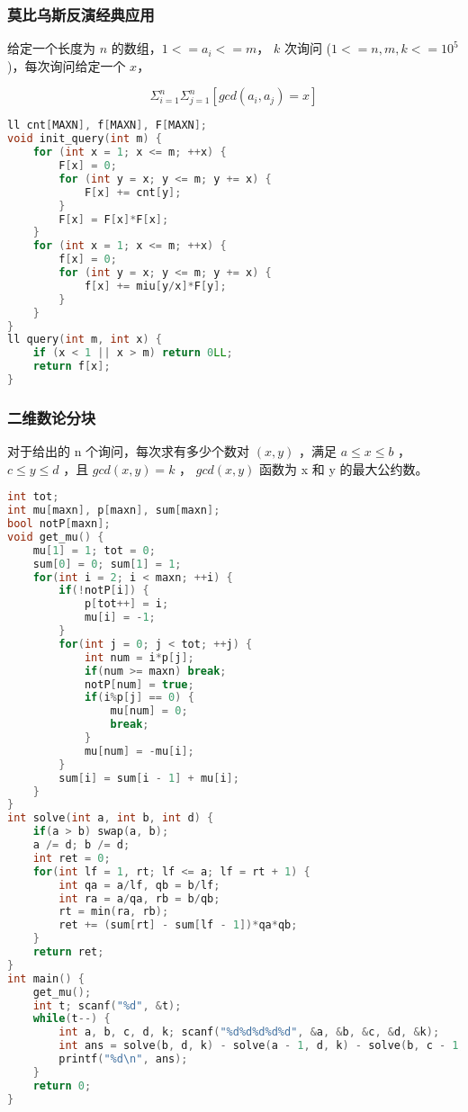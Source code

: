 \subsubsection{莫比乌斯反演经典应用}

给定一个长度为 $n$ 的数组，$1 <= a _ i <= m$， $k$ 次询问 ($ 1 <= n, m, k <= 10^5$)，每次询问给定一个 $x$， 

$$\Sigma _ {i = 1} ^ {n} \Sigma _ {j = 1} ^ {n} [gcd(a_i, a_j) = x]$$

\begin{lstlisting}[language=C++]
ll cnt[MAXN], f[MAXN], F[MAXN];
void init_query(int m) {
    for (int x = 1; x <= m; ++x) {
        F[x] = 0;
        for (int y = x; y <= m; y += x) {
            F[x] += cnt[y];
        }
        F[x] = F[x]*F[x];
    }
    for (int x = 1; x <= m; ++x) {
        f[x] = 0;
        for (int y = x; y <= m; y += x) {
            f[x] += miu[y/x]*F[y];
        }
    }
}
ll query(int m, int x) {
    if (x < 1 || x > m) return 0LL;
    return f[x];
}
\end{lstlisting}

\subsubsection{二维数论分块}

对于给出的 n 个询问，每次求有多少个数对 $(x, y)$ ，满足 $a \le x \le b$ ， $c \le y \le d$ ，且 $gcd(x, y) = k$ ， $gcd(x, y)$ 函数为 x 和 y 的最大公约数。

\begin{lstlisting}[language=C++]
int tot;
int mu[maxn], p[maxn], sum[maxn];
bool notP[maxn];
void get_mu() {
    mu[1] = 1; tot = 0;
    sum[0] = 0; sum[1] = 1;
    for(int i = 2; i < maxn; ++i) {
        if(!notP[i]) {
            p[tot++] = i;
            mu[i] = -1;
        }
        for(int j = 0; j < tot; ++j) {
            int num = i*p[j];
            if(num >= maxn) break;
            notP[num] = true;
            if(i%p[j] == 0) {
                mu[num] = 0;
                break;
            }
            mu[num] = -mu[i];
        }
        sum[i] = sum[i - 1] + mu[i];
    }
}
int solve(int a, int b, int d) {
    if(a > b) swap(a, b);
    a /= d; b /= d;
    int ret = 0;
    for(int lf = 1, rt; lf <= a; lf = rt + 1) {
        int qa = a/lf, qb = b/lf;
        int ra = a/qa, rb = b/qb;
        rt = min(ra, rb);
        ret += (sum[rt] - sum[lf - 1])*qa*qb;
    }
    return ret;
}
int main() {
    get_mu();
    int t; scanf("%d", &t);
    while(t--) {
        int a, b, c, d, k; scanf("%d%d%d%d%d", &a, &b, &c, &d, &k);
        int ans = solve(b, d, k) - solve(a - 1, d, k) - solve(b, c - 1, k) + solve(a - 1, c - 1, k);
        printf("%d\n", ans);
    }
    return 0;
}
\end{lstlisting}

